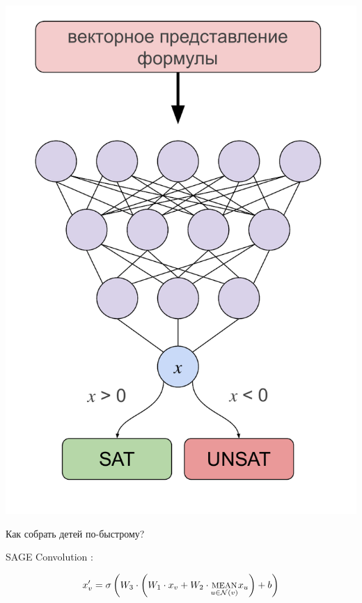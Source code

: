 \documentclass[14pt,aspectratio=169,hyperref={pdftex,unicode},xcolor=dvipsnames]{beamer}
\newcommand{\fakesc}[1]{\uppercase{{\footnotesize #1}}}
\renewcommand{\textsc}{\fakesc}
\begin{document}
\begin{frame}[noframenumbering]

\begin{center}
  \includegraphics[scale=0.45]{./assets/formula-decoder.pdf}
\end{center}

\end{frame}



\begin{frame}{Как собрать детей по-быстрому?}

SAGE Convolution \cite{sage-conv-paper}:

\begin{equation*}
  x_v' = \sigma \left(W_3 \cdot \left(W_1 \cdot x_v + W_2 \cdot \underset{u \in \mathcal{N}(v)}{\text{\textsc{mean}}} x_u \right) + b \right)
\end{equation*}

\end{frame}
\end{document}
